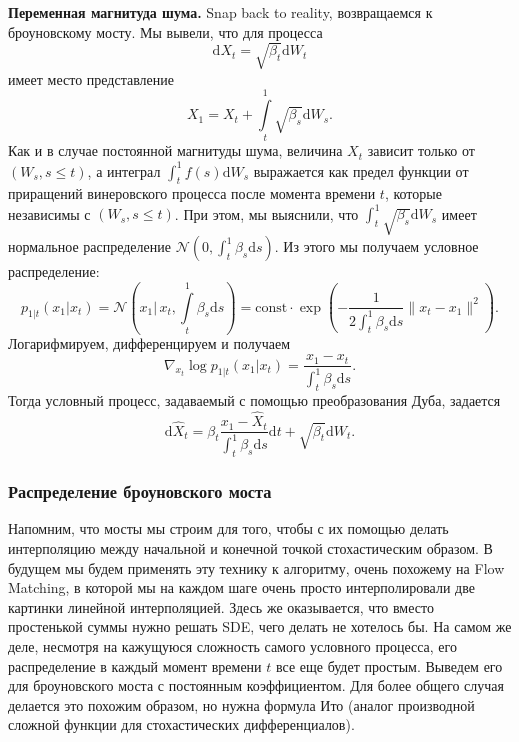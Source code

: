 \documentclass[12pt]{article}
\theoremstyle{definition}
\begin{document}
\noindent\textbf{Переменная магнитуда шума.} Snap back to reality, возвращаемся к броуновскому мосту. Мы вывели, что для процесса
\[
    \mathrm{d} X_t = \sqrt{\beta_t} \mathrm{d} W_t
\]
имеет место представление
\[
    X_1 = X_t + \int\limits_{t}^{1} \sqrt{\beta_s} \mathrm{d} W_s.
\]
Как и в случае постоянной магнитуды шума, величина $X_t$ зависит только от $(W_s, s \leq t)$, а интеграл $\int_{t}^{1} f(s) \mathrm{d}W_s$ выражается как предел функции от приращений винеровского процесса после момента времени $t$, которые независимы с $(W_s, s \leq t)$. При этом, мы выяснили, что $\int_{t}^1\sqrt{\beta_s}\mathrm{d}W_s$ имеет нормальное распределение $\mathcal{N}(0, \int_{t}^{1} \beta_s \mathrm{d} s)$. Из этого мы получаем условное распределение:
\[
    p_{1 | t}(x_1 | x_t) = \mathcal{N}\left(x_1 \Bigg|\, x_t, \int\limits_{t}^{1} \beta_s \mathrm{d} s\right) = \text{const} \cdot \exp \left(-\frac{1}{2 \int_{t}^1 \beta_s \mathrm{d}s} \|x_t - x_1\|^2 \right).
\]
Логарифмируем, дифференцируем и получаем
\[
    \nabla_{x_t} \log p_{1 | t}(x_1 | x_t) = \frac{x_1 - x_t}{\int_{t}^{1}\beta_s \mathrm{d}s}.
\]
Тогда условный процесс, задаваемый с помощью преобразования Дуба, задается
\[
    \mathrm{d} \hat{X}_t = \beta_t \frac{x_1 - \hat{X}_t}{\int_{t}^{1}\beta_s \mathrm{d} s} \mathrm{d} t + \sqrt{\beta_t}\mathrm{d} W_t.
\]

\subsubsection{Распределение броуновского моста}
Напомним, что мосты мы строим для того, чтобы с их помощью делать интерполяцию между начальной и конечной точкой стохастическим образом. В будущем мы будем применять эту технику к алгоритму, очень похожему на Flow Matching, в которой мы на каждом шаге очень просто интерполировали две картинки линейной интерполяцией. Здесь же оказывается, что вместо простенькой суммы нужно решать SDE, чего делать не хотелось бы. На самом же деле, несмотря на кажущуюся сложность самого условного процесса, его распределение в каждый момент времени $t$ все еще будет простым. Выведем его для броуновского моста с постоянным коэффициентом. Для более общего случая делается это похожим образом, но нужна формула Ито (аналог производной сложной функции для стохастических дифференциалов).
\end{document}
